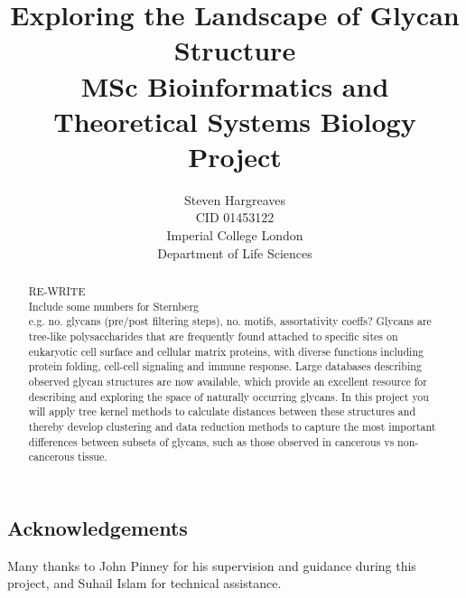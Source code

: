 \documentclass[12pt,a4paper]{article}
\begin{document}
{\selectfont}
\title{\Huge Exploring the Landscape of Glycan Structure\vspace{1cm}\\ \large  MSc Bioinformatics and Theoretical Systems Biology Project\vspace{11cm}}
\date{}

\author{\Large Steven Hargreaves\\
\normalsize CID 01453122 \\\vspace{0.5cm}
\normalsize Imperial College London \\
\normalsize Department of Life Sciences}


\maketitle
\newpage
\begin{abstract}
\doublespacing
\noindent RE-WRITE\\
Include some numbers for Sternberg\\
e.g. no. glycans (pre/post filtering steps), no. motifs, assortativity coeffs?
Glycans are tree-like polysaccharides that are frequently found attached to specific sites on eukaryotic cell surface and cellular matrix proteins, with diverse functions including protein folding, cell-cell signaling and immune response. Large databases describing observed glycan structures are now available, which provide an excellent resource for describing and exploring the space of naturally occurring glycans. In this project you will apply tree kernel methods to calculate distances between these structures and thereby develop clustering and data reduction methods to capture the most important differences between subsets of glycans, such as those observed in cancerous vs non-cancerous tissue.
\end{abstract}

\newpage
\begin{center}
\section*{Acknowledgements}
\doublespacing
Many thanks to John Pinney for his supervision and guidance during this project, and Suhail Islam for technical assistance.
\end{center}
\newpage
\tableofcontents
\newpage
\end{document}
